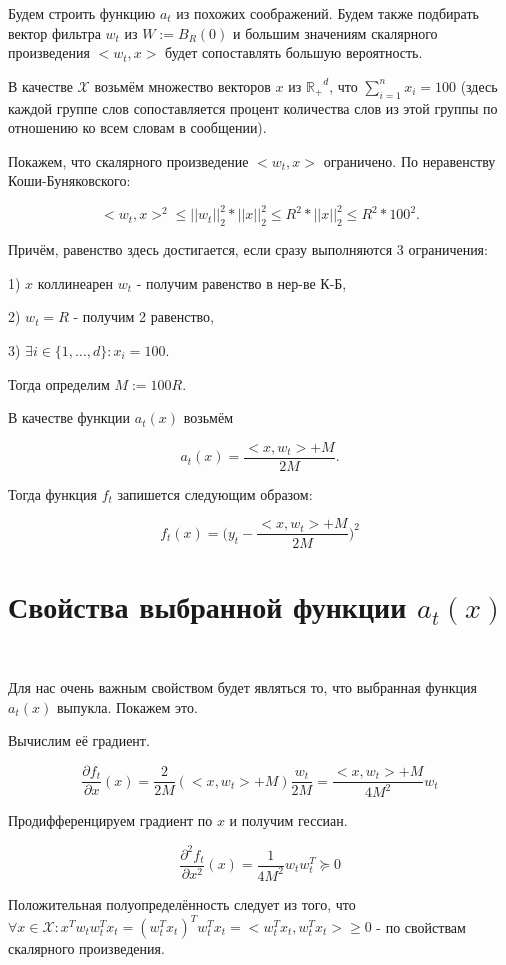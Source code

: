 \documentclass[12pt]{article}
\begin{document}
Будем строить функцию $a_t$ из похожих соображений. Будем также подбирать вектор фильтра $w_t$ из $W := B_R(0)$ и большим значениям скалярного произведения $<w_t, x>$ будет сопоставлять большую вероятность.

В качестве $\mathcal{X}$ возьмём множество векторов $x$ из $\mathbb{R_{+}}^d$, что $\sum\limits_{i=1}^n x_i = 100$ (здесь каждой группе слов сопоставляется процент количества слов из этой группы по отношению ко всем словам в сообщении).

Покажем, что скалярного произведение $<w_t, x>$ ограничено. По неравенству Коши-Буняковского:

$$<w_t, x>^2 \leq ||w_t||_2^2*||x||_2^2 \leq R^2*||x||_2^2 \leq R^2*100^2.$$

Причём, равенство здесь достигается, если сразу выполняются 3 ограничения:

1) $x$ коллинеарен $w_t$ - получим равенство в нер-ве К-Б,

2) $w_t=R$ - получим 2 равенство,

3) $\exists i \in \{1, \dots, d\}: x_i = 100$.

Тогда определим $M := 100R$.

В качестве функции $a_t(x)$ возьмём

 $$a_t(x) = \frac{<x, w_t>+M}{2M}.$$
 
 Тогда функция $f_t$ запишется следующим образом:
 
 $$f_t(x) = \bigg(y_t - \frac{<x, w_t>+M}{2M}\bigg)^2$$
 
\section*{Свойства выбранной функции $a_t(x)$}
$ $

Для нас очень важным свойством будет являться то, что выбранная функция $a_t(x)$ выпукла. Покажем это.

Вычислим её градиент.

$$\frac{\partial f_t}{\partial x}(x) = \frac{2}{2M}(<x, w_t>+M)\frac{w_t}{2M} = \frac{<x, w_t>+M}{4M^2}w_t$$

Продифференцируем градиент по $x$ и получим гессиан.

$$\frac{\partial^2 f_t}{\partial x^2}(x) = \frac{1}{4M^2}w_tw_t^T \succeq 0$$

Положительная полуопределённость следует из того, что $\forall x \in \mathcal{X}: x^Tw_tw_t^Tx_t = (w_t^Tx_t)^Tw_t^Tx_t = <w_t^Tx_t, w_t^Tx_t> \geq 0$ - по свойствам скалярного произведения.
\end{document}
